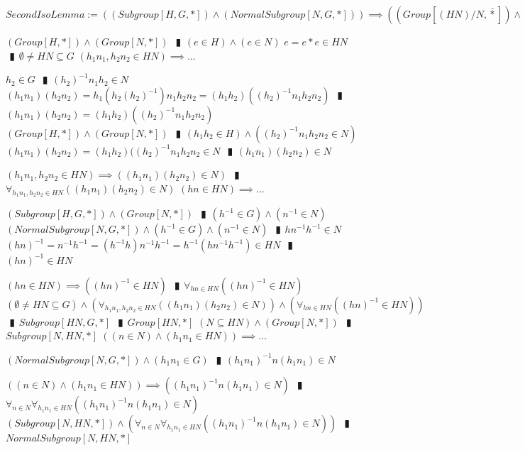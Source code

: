 \documentclass{book}
\newcommand{\abr}{:=}
\newcommand{\pipe}{$\phantom{(}\vrectangleblack\phantom{)}$}
\newcommand{\pr}[1]{\left(#1\right)}
\newcommand{\bbin}[1]{\mathbin{{\bar{#1}}}}
\begin{document}
$SecondIsoLemma \abr \pr{(Subgroup[H, G, *]) \land (NormalSubgroup[N, G, *])} \implies \pr{\pr{Group[(H N) / N, \bbin{*}]} \land \pr{Group[H / (H \cap N), \bbin{*}]}}$
\begin{enumerate}
  \lit $(Group[H, *]) \land (Group[N, *])$ \pipe $(e \in H) \land (e \in N)$
  \lit $e = e * e \in H N$ \pipe $\emptyset \neq H N \subseteq G$
  \lit $(h_1 n_1, h_2 n_2 \in H N) \implies \ldots$
  \begin{enumerate}
    \lit $h_2 \in G$ \pipe $(h_2)^{-1} n_1 h_2 \in N$
    \lit $(h_1 n_1) (h_2 n_2) = h_1 \pr{h_2 (h_2)^{-1}} n_1 h_2 n_2 = (h_1 h_2) \pr{(h_2)^{-1} n_1 h_2 n_2}$ \pipe $(h_1 n_1) (h_2 n_2) = (h_1 h_2) \pr{(h_2)^{-1} n_1 h_2 n_2}$
    \lit $(Group[H, *]) \land (Group[N, *])$ \pipe $(h_1 h_2 \in H) \land \pr{(h_2)^{-1} n_1 h_2 n_2 \in N}$
    \lit $(h_1 n_1) (h_2 n_2) = (h_1 h_2) ((h_2)^{-1} n_1 h_2 n_2 \in N$ \pipe $(h_1 n_1) (h_2 n_2) \in N$
  \end{enumerate}
  \lit $(h_1 n_1, h_2 n_2 \in H N) \implies \pr{(h_1 n_1) (h_2 n_2) \in N}$ \pipe $\forall_{h_1 n_1, h_2 n_2 \in H N}\pr{(h_1 n_1) (h_2 n_2) \in N}$
  \lit $(h n \in H N) \implies \ldots$
  \begin{enumerate}
    \lit $(Subgroup[H, G, *]) \land (Group[N, *])$ \pipe $(h^{-1} \in G) \land (n^{-1} \in N)$ 
    \lit $(NormalSubgroup[N, G, *]) \land (h^{-1} \in G) \land (n^{-1} \in N)$ \pipe  $h n^{-1} h^{-1} \in N$
    \lit $(h n)^{-1} = n^{-1} h^{-1} = (h^{-1} h) n^{-1} h^{-1} = h^{-1} (h n^{-1} h^{-1}) \in H N$ \pipe $(h n)^{-1} \in H N$
  \end{enumerate}
  \lit $(h n \in H N) \implies \pr{(h n)^{-1} \in H N}$ \pipe $\forall_{h n \in H N}\pr{(h n)^{-1} \in H N}$
  \lit $(\emptyset \neq H N \subseteq G) \land \pr{\forall_{h_1 n_1, h_2 n_2 \in H N}\pr{(h_1 n_1) (h_2 n_2) \in N}} \land \pr{\forall_{h n \in H N}\pr{(h n)^{-1} \in H N}}$ \pipe $Subgroup[H N, G, *]$ \pipe $Group[H N, *]$
  \lit $(N \subseteq H N) \land (Group[N, *])$ \pipe $Subgroup[N, H N, *]$
  \lit $\pr{(n \in N) \land (h_1 n_1 \in H N)} \implies \ldots$
  \begin{enumerate}
    \lit $(NormalSubgroup[N, G, *]) \land (h_1 n_1 \in G)$ \pipe $(h_1 n_1)^{-1} n (h_1 n_1) \in N$
  \end{enumerate}
  \lit $\pr{(n \in N) \land (h_1 n_1 \in H N)} \implies \pr{(h_1 n_1)^{-1} n (h_1 n_1) \in N}$ \pipe $\forall_{n \in N} \forall_{h_1 n_1 \in H N}\pr{(h_1 n_1)^{-1} n (h_1 n_1) \in N}$
  \lit $(Subgroup[N, H N, *]) \land \pr{\forall_{n \in N} \forall_{h_1 n_1 \in H N}\pr{(h_1 n_1)^{-1} n (h_1 n_1) \in N}}$ \pipe $NormalSubgroup[N, H N, *]$

\end{enumerate}
\end{document}

